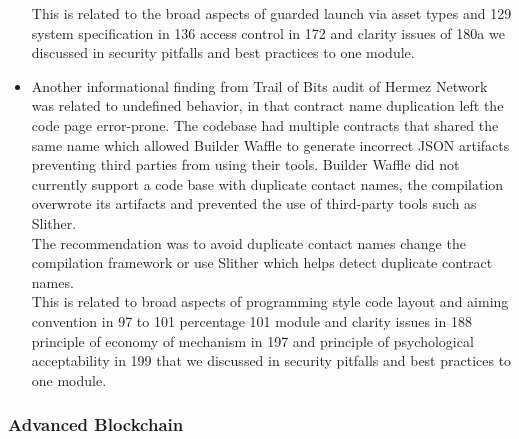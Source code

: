 \begin{itemize}
  This is related to the broad aspects of guarded launch via asset types
  and 129 system specification in 136 access control in 172 and clarity
  issues of 180a we discussed in security pitfalls and best practices to
  one module.
\item
  Another informational finding from Trail of Bits audit of Hermez
  Network was related to undefined behavior, in that contract name
  duplication left the code page error-prone. The codebase had multiple
  contracts that shared the same name which allowed Builder Waffle to
  generate incorrect JSON artifacts preventing third parties from using
  their tools. Builder Waffle did not currently support a code base with
  duplicate contact names, the compilation overwrote its artifacts and
  prevented the use of third-party tools such as Slither.\\

  The recommendation was to avoid duplicate contact names change the
  compilation framework or use Slither which helps detect duplicate
  contract names.\\

  This is related to broad aspects of programming style code layout and
  aiming convention in 97 to 101 percentage 101 module and clarity
  issues in 188 principle of economy of mechanism in 197 and principle
  of psychological acceptability in 199 that we discussed in security
  pitfalls and best practices to one module.
\end{itemize}

\subsubsection{Advanced Blockchain}\label{advanced-blockchain}

